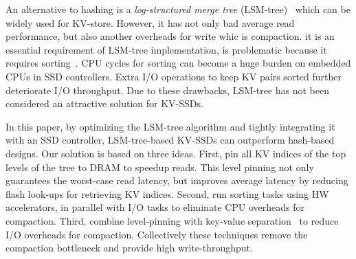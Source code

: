 \documentclass{abstract_hutech}
\begin{document}

An alternative to hashing is a \emph{log-structured merge tree} (LSM-tree)~\cite{lsm-tree} which can be widely used for KV-store.
However, it has not only bad average read performance, but also another overheads for write whic is compaction. 
it is an essential requirement of LSM-tree implementation, is problematic because it requires sorting~\cite{wisckey}.
CPU cycles for sorting can become a huge burden on embedded CPUs in SSD controllers. Extra I/O operations to keep KV pairs sorted further deteriorate I/O throughput.  
Due to these drawbacks, LSM-tree has not been considered an attractive solution for KV-SSDs.

%
In this paper, by optimizing the LSM-tree algorithm and tightly integrating it with an SSD controller, LSM-tree-based KV-SSDs can outperform hash-based designs.  
Our solution is based on three ideas.
First, pin all KV indices of the top levels of the tree to DRAM to speedup reads.
This level pinning not only guarantees the worst-case read latency, but improves average latency by reducing flash look-ups for retrieving KV indices.  
Second, run sorting tasks using HW accelerators, in parallel with I/O tasks to eliminate CPU overheads for compaction.
Third, combine level-pinning with key-value separation~\cite{wisckey} to reduce I/O overheads for compaction.
Collectively these techniques remove the compaction bottleneck and provide high write-throughput.
\end{document}
